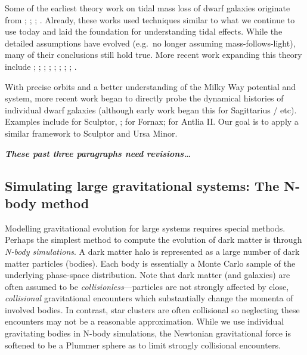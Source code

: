 Some of the earliest theory work on tidal mass loss of dwarf galaxies
originate from \citet{oh+lin+aarseth1995}; \citet{piatek+pryor1995};
\citet{moore+davis1994}; \citet{johnston+spergel+hernquist1995}.
Already, these works used techniques similar to what we continue to use
today and laid the foundation for understanding tidal effects. While the
detailed assumptions have evolved (e.g.~no longer assuming
mass-follows-light), many of their conclusions still hold true. More
recent work expanding this theory include \citet{read+2006};
\citet{bullock+johnston2005}; \citet{PNM2008}; \citet{penarrubia+2009};
\citet{klimentowski+2009}; \citet{errani+2023a}; \citet{fattahi+2018};
\citet{stucker+2023}; \citet{wang+2017}.

With precise orbits and a better understanding of the Milky Way
potential and system, more recent work began to directly probe the
dynamical histories of individual dwarf galaxies (although early work
began this for Sagittarius / etc). Examples include \citet{iorio+2019}
for Sculptor, \citet{borukhovetskaya+2022}; \citet{dicintio+2024} for
Fornax; \citet{borukhovetskaya+2022a} for Antlia II. Our goal is to
apply a similar framework to Sculptor and Ursa Minor.

\textbf{\emph{These past three paragraphs need revisions\ldots{}}}

\subsection{Simulating large gravitational systems: The N-body
method}\label{simulating-large-gravitational-systems-the-n-body-method}

Modelling gravitational evolution for large systems requires special
methods. Perhaps the simplest method to compute the evolution of dark
matter is through \emph{N-body simulations}. A dark matter halo is
represented as a large number of dark matter particles (bodies). Each
body is essentially a Monte Carlo sample of the underlying phase-space
distribution. Note that dark matter (and galaxies) are often assumed to
be \emph{collisionless}---particles are not strongly affected by close,
\emph{collisional} gravitational encounters which substantially change
the momenta of involved bodies. In contrast, star clusters are often
collisional so neglecting these encounters may not be a reasonable
approximation. While we use individual gravitating bodies in N-body
simulations, the Newtonian gravitational force is softened to be a
Plummer sphere as to limit strongly collisional encounters.

